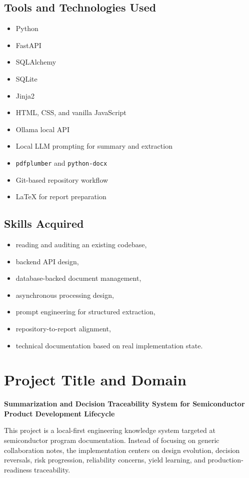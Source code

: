 \documentclass[12pt, a4paper]{article}
\begin{document}
\subsection{Tools and Technologies Used}
\begin{itemize}
\item Python
\item FastAPI
\item SQLAlchemy
\item SQLite
\item Jinja2
\item HTML, CSS, and vanilla JavaScript
\item Ollama local API
\item Local LLM prompting for summary and extraction
\item \texttt{pdfplumber} and \texttt{python-docx}
\item Git-based repository workflow
\item LaTeX for report preparation
\end{itemize}

\subsection{Skills Acquired}
\begin{itemize}
\item reading and auditing an existing codebase,
\item backend API design,
\item database-backed document management,
\item asynchronous processing design,
\item prompt engineering for structured extraction,
\item repository-to-report alignment,
\item technical documentation based on real implementation state.
\end{itemize}

\section{Project Title and Domain}
\textbf{Summarization and Decision Traceability System for Semiconductor Product Development Lifecycle}

This project is a local-first engineering knowledge system targeted at semiconductor program documentation. Instead of focusing on generic collaboration notes, the implementation centers on design evolution, decision reversals, risk progression, reliability concerns, yield learning, and production-readiness traceability.
\end{document}
